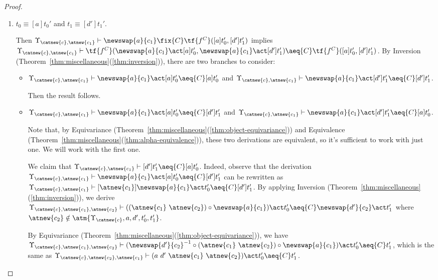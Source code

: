 \begin{proof}
\begin{description}
\begin{enumerate}
\begin{enumerate}
            \item $t_0\equiv [a]t_0'$ and $t_1 \equiv [d']t_1'$.

            Then $\Upsilon_{\catnew{c},\atnew{c_1}}\vdash \newswap{a}{c_1}\fix{C} \tf{f^C}([a]t_0',[d']t_1')$ implies $\Upsilon_{\catnew{c},\atnew{c_1}}\vdash \tf{f^C}( \newswap{a}{c_1}\act[a]t_0', \newswap{a}{c_1}\act  [d']t_1')\aeq{C} \tf{f^C}([a]t_0',[d']t_1')$. By Inversion (Theorem~\ref{thm:miscellaneous}(\ref{thm:inversion})), there are two branches to consider:
        \begin{itemize}
             \item $\Upsilon_{\catnew{c},\atnew{c_1}}\vdash  \newswap{a}{c_1}\act[a]t_0'\aeq{C} [a]t_0'$ and $\Upsilon_{\catnew{c},\atnew{c_1}}\vdash  \newswap{a}{c_1}\act[d']t_1'\aeq{C} [d']t_1'$.

             Then the result follows.

            \item $\Upsilon_{\catnew{c},\atnew{c_1}}\vdash  \newswap{a}{c_1}\act[a]t_0'\aeq{C} [d']t_1'$ and $\Upsilon_{\catnew{c},\atnew{c_1}}\vdash  \newswap{a}{c_1}\act[d']t_1'\aeq{C} [a]t_0'$.

            Note that, by Equivariance (Theorem~\ref{thm:miscellaneous}(\ref{thm:object-equivariance})) and Equivalence (Theorem~\ref{thm:miscellaneous}(\ref{thm:alpha-equivalence})), these two derivations are equivalent, so it's sufficient to work with just one. We will work with the first one.

            We claim that $\Upsilon_{\catnew{c},\atnew{c_1}} \vdash  [d']t_1' \aeq{C} [a]t_0'$. Indeed, observe that the derivation $\Upsilon_{\catnew{c},\atnew{c_1}} \vdash \newswap{a}{c_1} \act [a]t_0' \aeq{C} [d']t_1'$ can be rewritten as $\Upsilon_{\catnew{c},\atnew{c_1}} \vdash [\atnew{c_1}]\newswap{a}{c_1} \act t_0' \aeq{C} [d']t_1'$. By applying Inversion (Theorem~\ref{thm:miscellaneous}(\ref{thm:inversion})), we derive $\Upsilon_{\catnew{c},\atnew{c_1},\atnew{c_2}} \vdash ((\atnew{c_1} \ \atnew{c_2}) \circ \newswap{a}{c_1}) \act t_0' \aeq{C} \newswap{d'}{c_2} \act t_1'$ where $\atnew{c_2}\notin \atm{\Upsilon_{\catnew{c}},a,d',t_0',t_1'}$.

            By Equivariance (Theorem~\ref{thm:miscellaneous}(\ref{thm:object-equivariance})), we have $\Upsilon_{\catnew{c},\atnew{c_1},\atnew{c_2}} \vdash (\newswap{d'}{c_2}^{-1} \circ (\atnew{c_1} \ \atnew{c_2}) \circ \newswap{a}{c_1}) \act t_0' \aeq{C} t_1'$, which is the same as $\Upsilon_{\catnew{c},\atnew{c_2},\atnew{c_1}} \vdash (a \ d' \ \atnew{c_1} \ \atnew{c_2}) \act t_0' \aeq{C} t_1'$.


\end{itemize}
\end{enumerate}
\end{enumerate}
\end{description}
\end{proof}
